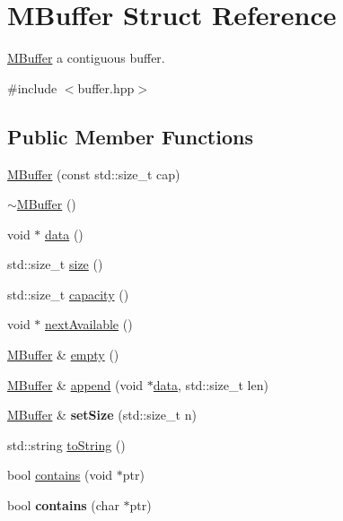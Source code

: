 \hypertarget{struct_m_buffer}{}\section{M\+Buffer Struct Reference}
\label{struct_m_buffer}


\hyperlink{struct_m_buffer}{M\+Buffer} a contiguous buffer.  




{\ttfamily \#include $<$buffer.\+hpp$>$}

\subsection*{Public Member Functions}
\begin{DoxyCompactItemize}
\item 
\hyperlink{struct_m_buffer_a4f12e1ae3dc9acf4739f4cb8df49cb98}{M\+Buffer} (const std\+::size\+\_\+t cap)
\item 
\hyperlink{struct_m_buffer_a7afd94b5e8b2a26ffab8ede1aef06f07}{$\sim$\+M\+Buffer} ()
\item 
void $\ast$ \hyperlink{struct_m_buffer_a76fda1089c0abb54ac72977228245725}{data} ()
\item 
std\+::size\+\_\+t \hyperlink{struct_m_buffer_a9b3db2bdbcadcb68478cc5edc6164432}{size} ()
\item 
std\+::size\+\_\+t \hyperlink{struct_m_buffer_acadde0f7cb85b05602a61aa8e3277369}{capacity} ()
\item 
void $\ast$ \hyperlink{struct_m_buffer_a3a520754e8335f75136135caea741960}{next\+Available} ()
\item 
\hyperlink{struct_m_buffer}{M\+Buffer} \& \hyperlink{struct_m_buffer_a6b1a469848174ab1925e964034408c07}{empty} ()
\item 
\hyperlink{struct_m_buffer}{M\+Buffer} \& \hyperlink{struct_m_buffer_abb2765e8b761bbd0c17fdd7bdaada053}{append} (void $\ast$\hyperlink{struct_m_buffer_a76fda1089c0abb54ac72977228245725}{data}, std\+::size\+\_\+t len)
\item 
\mbox{\label{struct_m_buffer_a29b005cac5a7d2a7690145e8c3121e6f}} 
\hyperlink{struct_m_buffer}{M\+Buffer} \& {\bfseries set\+Size} (std\+::size\+\_\+t n)
\item 
std\+::string \hyperlink{struct_m_buffer_af3600a4125123ee2b0e62fb84fd758a0}{to\+String} ()
\item 
bool \hyperlink{struct_m_buffer_a629f84798448ae301df28d3d54520135}{contains} (void $\ast$ptr)
\item 
\mbox{\label{struct_m_buffer_ae84bf1ea3e993bef7967ea4685fd8adc}} 
bool {\bfseries contains} (char $\ast$ptr)
\end{DoxyCompactItemize}
